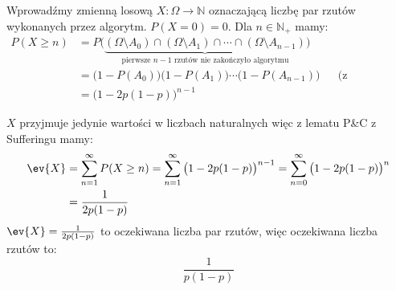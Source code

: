 Wprowadźmy zmienną losową \(X \colon \Omega \to \mathbb{N}\) oznaczającą liczbę
par rzutów wykonanych przez algorytm. \(P(X = 0) = 0\).
Dla \(n \in \mathbb{N}_+\) mamy:
\begin{align*}
	P(X \geq n) & = P\big(
	\underbrace{(\Omega \setminus A_0) \cap (\Omega \setminus A_1) \cap \cdots \cap (\Omega \setminus A_{n-1})}
	_\text{pierwsze \(n-1\) rzutów nie zakończyło algorytmu}
	\big)                                                                                                          \\
	            & = \big(1-P(A_0)\big)\big(1-P(A_1)\big)\cdots\big(1-P(A_{n-1})\big) &  & \text{(z niezależności)} \\
	            & = \big(1-2p(1-p)\big)^{n-1}
\end{align*}

\(X\) przyjmuje jedynie wartości w liczbach naturalnych więc z lematu P\&C
z Sufferingu mamy:
\begin{align*}
	\ev{X}
	 & = \sum_{n=1}^{\infty} P(X \geq n)
	= \sum_{n=1}^{\infty} \big(1-2p(1-p)\big)^{n-1}
	= \sum_{n=0}^{\infty} \big(1-2p(1-p)\big)^n \\
	 & = \frac{1}{2p(1-p)}
\end{align*}
\(\ev{X} = \frac{1}{2p(1-p)}\) to oczekiwana liczba par rzutów,
więc oczekiwana liczba rzutów to:
\[
	\boxed{\frac{1}{p(1-p)}}
\]
